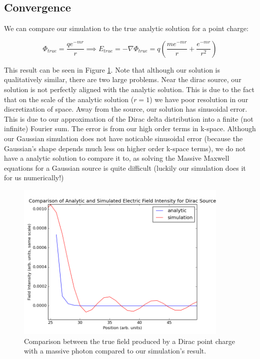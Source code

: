\documentclass{article}
\begin{document}
	
	\subsection{Convergence} We can compare our simulation to the true analytic solution for a point charge:
	
	\begin{equation}
		\Phi_{true} = \frac{qe^{-mr}}{r} \implies E_{true} = -\nabla \Phi_{true} = q\left(\frac{me^{-mr}}{r} + \frac{e^{-mr}}{r^2}\right)
	\end{equation}
	
	This result can be seen in Figure \ref{fig:convergence}. Note that although our solution is qualitatively similar, there are two large problems. Near the dirac source, our solution is not perfectly aligned with the analytic solution. This is due to the fact that on the scale of the analytic solution ($r = 1$) we have poor resolution in our discretization of space. Away from the source, our solution has sinusoidal error. This is due to our approximation of the Dirac delta distribution into a finite (not infinite) Fourier sum. The error is from our high order terms in k-space. Although our Gaussian simulation does not have noticable sinusoidal error (because the Gaussian's shape depends much less on higher order k-space terms), we do not have a analytic solution to compare it to, as solving the Massive Maxwell equations for a Gaussian source is quite difficult (luckily our simulation does it for us numerically!)
	
	\begin{figure}
		\centering
		\includegraphics[width=4in]{dirac_field_comparison}
		\caption{Comparison between the true field produced by a Dirac point charge with a massive photon compared to our simulation's result.}
		\label{fig:convergence}
	\end{figure} 
	
\end{document}
